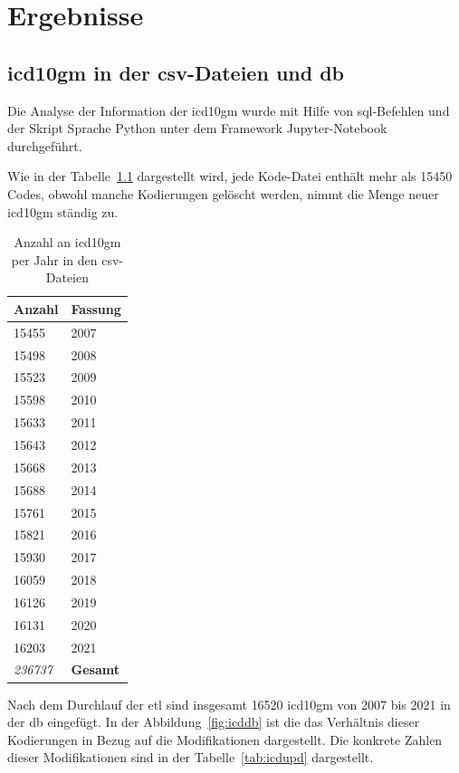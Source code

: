 \chapter{Ergebnisse} \label{ch:results}

\section{\acs{icd10gm} in der \acs{csv}-Dateien und \acs{db}} \label{sec:dataanalysis}
Die Analyse der Information der \ac{icd10gm} wurde mit Hilfe von \ac{sql}-Befehlen und der Skript Sprache Python unter dem Framework Jupyter-Notebook durchgeführt.

Wie in der Tabelle~\ref{tab:icdfiles} dargestellt wird, jede Kode-Datei enthält mehr als \textsf{15450} Codes, obwohl manche Kodierungen gelöscht werden, nimmt die Menge neuer \ac{icd10gm} ständig zu.

\begin{table}[ht]
	\centering
	\small
	\caption[\acs{icd10gm} in den \acs{csv}-Dateien]{Anzahl an \acs{icd10gm} per Jahr in den \ac{csv}-Dateien}
	\label{tab:icdfiles}
	\begin{tabular}{|l|l|}
		\hline
	\rowcolor{lightgray} Anzahl & Fassung \\ \hline 
		15455 & 2007 \\ \hline
		15498 & 2008 \\ \hline
		15523 & 2009 \\ \hline
		15598 & 2010 \\ \hline
		15633 & 2011 \\ \hline
		15643 & 2012 \\ \hline
		15668 & 2013 \\ \hline
		15688 & 2014 \\ \hline
		15761 & 2015 \\ \hline
		15821 & 2016 \\ \hline
		15930 & 2017 \\ \hline
		16059 & 2018 \\ \hline
		16126 & 2019 \\ \hline
		16131 & 2020 \\ \hline
		16203 & 2021 \\ \hline
		\hline
		\textit{236737} & \textbf{Gesamt} \\ \hline
	\end{tabular}
	\end{table}

Nach dem Durchlauf der \ac{etl} sind insgesamt \textsf{16520} \ac{icd10gm} von 2007 bis 2021 in der \ac{db} eingefügt. In der Abbildung~\ref{fig:icddb} ist die das Verhältnis dieser Kodierungen in Bezug auf die Modifikationen dargestellt. Die konkrete Zahlen dieser Modifikationen sind in der Tabelle~\ref{tab:icdupd} dargestellt. 
 
